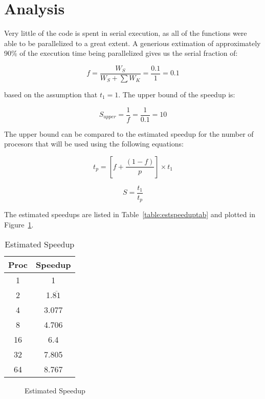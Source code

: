 \documentclass{article}
\begin{document}
  \section{Analysis}

  Very little of the code is spent in serial execution, as all of the functions
  were able to be parallelized to a great extent. A generious extimation of
  approximately 90\% of the execution time being parallelized gives us the
  serial fraction of:

  \[ f = \frac{W_S}{W_S + \sum W_K} = \frac{0.1}{1} = 0.1 \]

  based on the assumption that \( t_1 = 1 \). The upper bound of the speedup 
  is:

  \[ S_{upper} = \frac{1}{f} = \frac{1}{0.1} = 10 \]

  The upper bound can be compared to the estimated speedup for the number of
  procesors that will be used using the following equations:

  \[ t_p = \left[ f + \frac{\left( 1 - f \right)}{p} \right] \times t_1 \]

  \[ S = \frac{t_1}{t_p} \]

  The estimated speedups are listed in Table~\ref{table:estspeeduptab} and plotted
  in Figure~\ref{fig:estspeedupfig}.

  \begin{table}[H]
    \caption{Estimated Speedup}
    \label{tab:estspeeduptab}
    \centering

    \begin{tabular}{|c|c|}
      \hline
      Proc & Speedup \\
      \hline
      1  & 1                  \\
      2  & 1.$\overline{81}$  \\
      4  & 3.077              \\
      8  & 4.706              \\
      16 & 6.4                \\
      32 & 7.805              \\
      64 & 8.767              \\
      \hline
    \end{tabular}
  \end{table}

  \begin{figure}[H]
    \caption{Estimated Speedup}
    \label{fig:estspeedupfig}
    \centering

  \end{figure}
\end{document}
